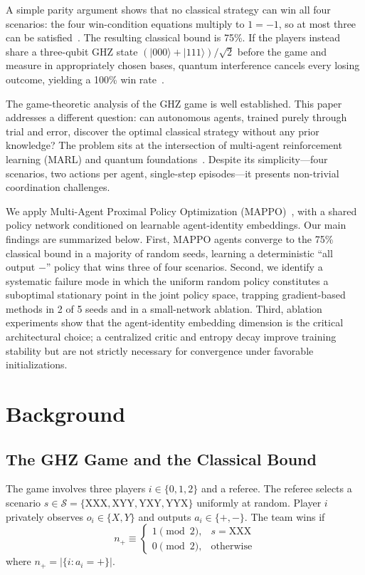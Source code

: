 \documentclass[journal]{IEEEtran}
\begin{document}
A simple parity argument shows that no classical strategy can win all four scenarios: the four win-condition equations multiply to $1 = -1$, so at most three can be satisfied~\cite{mermin1990mysteries}. The resulting classical bound is 75\%. If the players instead share a three-qubit GHZ state $(|000\rangle + |111\rangle)/\sqrt{2}$ before the game and measure in appropriately chosen bases, quantum interference cancels every losing outcome, yielding a 100\% win rate~\cite{mermin1990extreme,brassard2003}.

The game-theoretic analysis of the GHZ game is well established. This paper addresses a different question: can autonomous agents, trained purely through trial and error, discover the optimal classical strategy without any prior knowledge? The problem sits at the intersection of multi-agent reinforcement learning (MARL) and quantum foundations~\cite{gronauer2022marl}. Despite its simplicity---four scenarios, two actions per agent, single-step episodes---it presents non-trivial coordination challenges.

We apply Multi-Agent Proximal Policy Optimization (MAPPO)~\cite{yu2022mappo}, with a shared policy network conditioned on learnable agent-identity embeddings. Our main findings are summarized below. First, MAPPO agents converge to the 75\% classical bound in a majority of random seeds, learning a deterministic ``all output $-$'' policy that wins three of four scenarios. Second, we identify a systematic failure mode in which the uniform random policy constitutes a suboptimal stationary point in the joint policy space, trapping gradient-based methods in 2 of 5 seeds and in a small-network ablation. Third, ablation experiments show that the agent-identity embedding dimension is the critical architectural choice; a centralized critic and entropy decay improve training stability but are not strictly necessary for convergence under favorable initializations.

\section{Background}

\subsection{The GHZ Game and the Classical Bound}

The game involves three players $i \in \{0,1,2\}$ and a referee. The referee selects a scenario $s \in \mathcal{S} = \{\text{XXX}, \text{XYY}, \text{YXY}, \text{YYX}\}$ uniformly at random. Player $i$ privately observes $o_i \in \{X, Y\}$ and outputs $a_i \in \{+, -\}$. The team wins if
\begin{equation}
    n_+ \equiv \begin{cases}
        1 \pmod{2}, & s = \text{XXX} \\
        0 \pmod{2}, & \text{otherwise}
    \end{cases}
\end{equation}
where $n_+ = |\{i : a_i = +\}|$.
\end{document}
